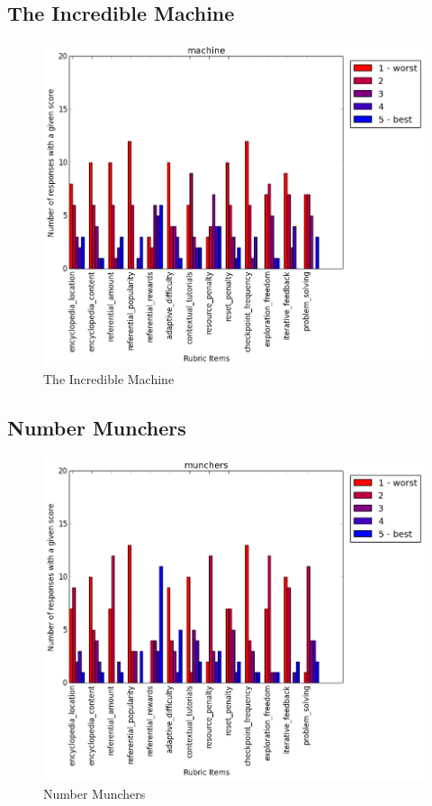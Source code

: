 			\subsection{The Incredible Machine}

				\begin{figure}[] 
				\centering 
				\includegraphics[width=\textwidth, height=.4\textheight, keepaspectratio=true]{machine_scores.png} 
				\caption{The Incredible Machine}
				\end{figure}

			\subsection{Number Munchers}

				\begin{figure}[] 
				\centering 
				\includegraphics[width=\textwidth, height=.4\textheight, keepaspectratio=true]{munchers_scores.png} 
				\caption{Number Munchers}
				\end{figure}

